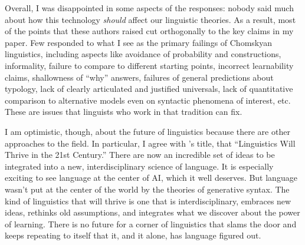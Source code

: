 \documentclass[output=paper,colorlinks,citecolor=brown
]{langscibook}
\begin{document}


% 
Overall, I was disappointed in some aspects of the responses: nobody said much about how this technology \emph{should} affect our linguistic theories. As a result, most of the points that these authors raised cut orthogonally to the key claims in my paper.  Few responded to what I see as the primary failings of Chomskyan linguistics, including aspects like avoidance of probability and constructions, informality, failure to compare to different starting points, incorrect learnability claims, shallowness of ``why'' answers, failures of general predictions about  typology, lack of clearly articulated and justified universals, lack of quantitative comparison to alternative models even on syntactic phenomena of interest, etc. These are issues that linguists who work in that tradition can fix. 

I am optimistic, though, about the future of linguistics because there are other approaches to the field. In particular, I agree with \cite{kodner2023linguistics}'s title, that ``Linguistics Will Thrive in the 21st Century.'' There are now an incredible set of ideas to be integrated into a new, interdisciplinary science of language. It is especially exciting to see language at the center of AI, which it well deserves. But language wasn't put at the center of the world by the theories of generative syntax. The kind of linguistics that will thrive is one that is interdisciplinary, embraces new ideas, rethinks old assumptions, and integrates what we discover about the power of learning. There is no future for a corner of linguistics that slams the door and keeps repeating to itself that it, and it alone, has language figured out. %












\end{document}
